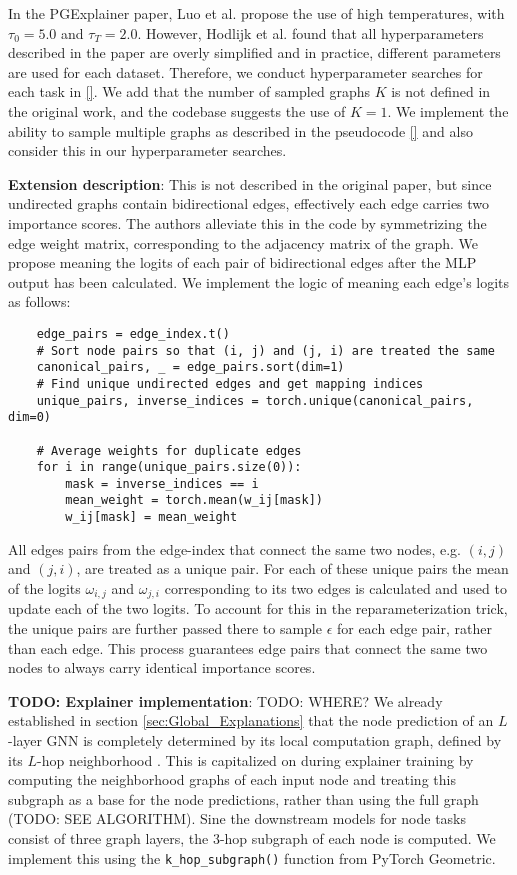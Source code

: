 In the PGExplainer paper, Luo et al. \cite{} propose the use of high temperatures, with $\tau_0 = 5.0$ and $\tau_T=2.0$. However, Hodlijk et al. \cite{} found that all hyperparameters described in the paper are overly simplified and in practice, different parameters are used for each dataset. Therefore, we conduct hyperparameter searches for each task in \ref{}. We add that the number of sampled graphs $K$ is not defined in the original work, and the codebase suggests the use of $K=1$. We implement the ability to sample multiple graphs as described in the pseudocode \ref{} and also consider this in our hyperparameter searches. \bigskip

\textbf{Extension description}:
This is not described in the original paper, but since undirected graphs contain bidirectional edges, effectively each edge carries two importance scores. The authors alleviate this in the code by symmetrizing the edge weight matrix, corresponding to the adjacency matrix of the graph. We propose meaning the logits of each pair of bidirectional edges after the MLP output has been calculated. We implement the logic of meaning each edge's logits as follows: 
\begin{verbatim}
    edge_pairs = edge_index.t()
    # Sort node pairs so that (i, j) and (j, i) are treated the same
    canonical_pairs, _ = edge_pairs.sort(dim=1)
    # Find unique undirected edges and get mapping indices
    unique_pairs, inverse_indices = torch.unique(canonical_pairs, dim=0)
    
    # Average weights for duplicate edges
    for i in range(unique_pairs.size(0)):
        mask = inverse_indices == i
        mean_weight = torch.mean(w_ij[mask])
        w_ij[mask] = mean_weight
\end{verbatim}
All edges pairs from the edge-index that connect the same two nodes, e.g. $(i,j)$ and $(j,i)$, are treated as a unique pair. For each of these unique pairs the mean of the logits $\omega_{i,j}$ and $\omega_{j,i}$ corresponding to its two edges is calculated and used to update each of the two logits. To account for this in the reparameterization trick, the unique pairs are further passed there to sample $\epsilon$ for each edge pair, rather than each edge. This process guarantees edge pairs that connect the same two nodes to always carry identical importance scores. \bigskip

\textbf{TODO: Explainer implementation}:
TODO: WHERE? We already established in section \ref{sec:Global_Explanations} that the node prediction of an $L$-layer GNN is completely determined by its local computation graph, defined by its $L$-hop neighborhood \cite{ying2019gnnexplainer}. This is capitalized on during explainer training by computing the neighborhood graphs of each input node and treating this subgraph as a base for the node predictions, rather than using the full graph (TODO: SEE ALGORITHM). Sine the downstream models for node tasks consist of three graph layers, the $3$-hop subgraph of each node is computed. We implement this using the \verb|k_hop_subgraph()| function from PyTorch Geometric. \bigskip

